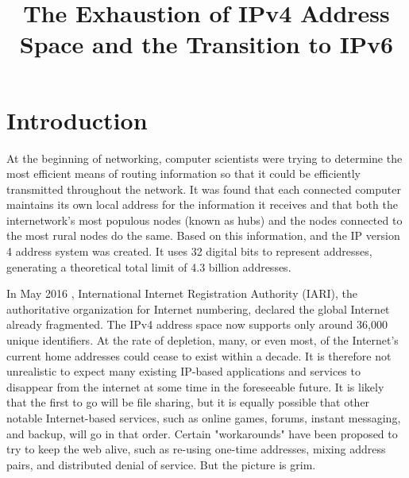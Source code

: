 \documentclass[conference]{IEEEtran}
\begin{document}
\title{The Exhaustion of IPv4 Address Space and the Transition to IPv6}

\author{
  \and
  \and
}

\maketitle

\section{Introduction}
At the beginning of networking, computer scientists were trying to determine the most efficient means of routing information so that it could be efficiently transmitted throughout the network. It was found that each connected computer maintains its own local address for the information it receives and that both the internetwork's most populous nodes (known as hubs) and the nodes connected to the most rural nodes do the same. Based on this information, and the IP version 4 address system was created. It uses 32 digital bits to represent addresses, generating a theoretical total limit of 4.3 billion addresses.

In May 2016 , International Internet Registration Authority (IARI), the authoritative organization for Internet numbering, declared the global Internet already fragmented. The IPv4 address space now supports only around 36,000 unique identifiers. At the rate of depletion, many, or even most, of the Internet's current home addresses could cease to exist within a decade. It is therefore not unrealistic to expect many existing IP-based applications and services to disappear from the internet at some time in the foreseeable future. It is likely that the first to go will be file sharing, but it is equally possible that other notable Internet-based services, such as online games, forums, instant messaging, and backup, will go in that order. Certain "workarounds" have been proposed to try to keep the web alive, such as re-using one-time addresses, mixing address pairs, and distributed denial of service. But the picture is grim.
\end{document}

